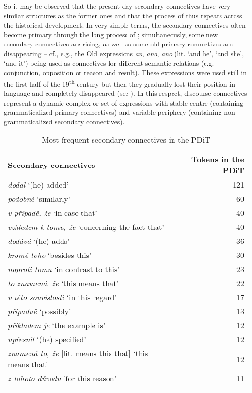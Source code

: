 \documentclass[output=paper]{langsci/langscibook.cls}
\begin{document}
So it may be observed that the present-day secondary connectives have very similar structures as the former ones and that the process of  thus repeats across the historical development. In very simple terms, the secondary connectives often become primary through the long process of ; simultaneously, some new secondary connectives are rising, as well as some old primary connectives are disappearing – cf., e.g., the Old  expressions \textit{an}, \textit{ana}, \textit{ano} (lit. `and he', `and she', `and it') being used as connectives for different semantic relations (e.g. conjunction, opposition or reason and result). These expressions were used still in the first half of the 19\textsuperscript{th} century but then they gradually lost their position in language and completely disappeared (see \citealt{grepl1956}). In this respect, discourse connectives represent a dynamic complex or set of expressions with stable centre (containing grammaticalized primary connectives) and variable periphery (containing non-grammaticalized secondary connectives).

\begin{table}
\begin{tabularx}{\textwidth}{>{\raggedright}lr}
\lsptoprule
 {Secondary connectives} &
 {Tokens in the PDiT}\\
\midrule
 \textit{dodal} `(he) added' &
 121\\
 \textit{podobně }`similarly' &
 60\\
 \textit{v případě, že} `in case that' &
 40\\
 \textit{vzhledem k tomu, že} `concerning the fact that' &
 40\\
 \textit{dodává }`(he) adds' &
 36\\
 \textit{kromě toho} `besides this' &
 30\\
 \textit{naproti tomu} `in contrast to this' &
 23\\
 \textit{to znamená, že} `this means that' &
 22\\
 \textit{v této souvislosti} `in this regard' &
 17\\
 \textit{případně }`possibly' &
 13\\
 \textit{příkladem je} `the example is' &
 12\\
 \textit{upřesnil} `(he) specified' &
 12\\
 \textit{znamená to, že} [lit. means this that] `this means that' &
 12\\
 \textit{z tohoto důvodu} `for this reason' &
 11\\
   \lspbottomrule
\end{tabularx}
\caption{Most frequent secondary connectives in the PDiT}
\label{tab:secConnectives}
\end{table}
\end{document}
